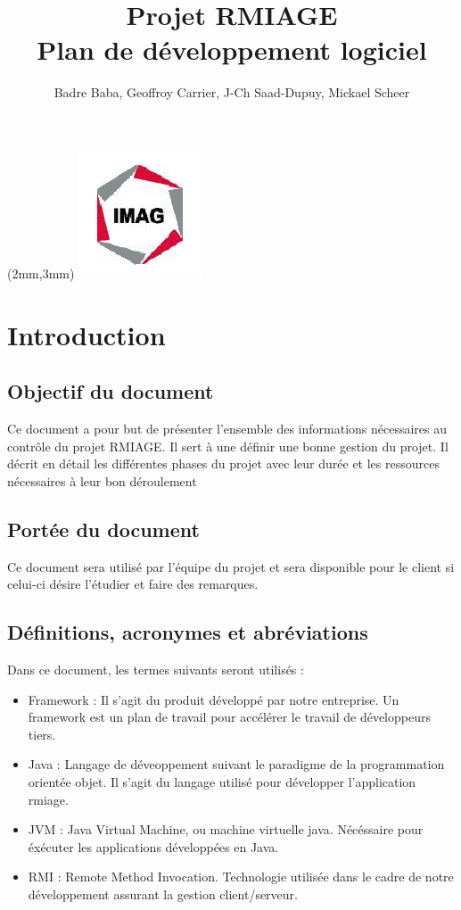 \documentclass[a4paper,10pt,twoside]{article}
\begin{document}
\title{Projet RMIAGE\\ \Huge{Plan de développement logiciel} }
\author{
	Badre Baba, Geoffroy Carrier, J-Ch Saad-Dupuy, Mickael Scheer
}

\begin{center}
\begin{textblock*}{35cm}(2mm,3mm)
\includegraphics[scale=0.8]{../cc/imag_logo.png}
\end{textblock*}
\end{center}
 
\maketitle


\section{Introduction}
\subsection{Objectif du document}
Ce document a pour but de présenter l'ensemble des informations nécessaires au
contrôle du projet RMIAGE. Il sert à une définir une bonne gestion du projet.
Il décrit en détail les différentes phases du projet avec leur durée et les ressources nécessaires à leur bon 	déroulement

\subsection{Portée du document}
Ce document sera utilisé par l’équipe du projet et sera disponible pour le client si celui-ci désire l’étudier et faire des remarques. 

\subsection{Définitions, acronymes et abréviations}
Dans ce document, les termes suivants seront utilisés :
\begin{itemize}
	\item Framework :
Il s'agit du produit développé par notre entreprise. Un framework est un plan de travail pour accélérer le travail de développeurs tiers.
	\item Java :
Langage de déveoppement suivant le paradigme de la programmation orientée objet. Il s'agit du langage utilisé pour développer l'application rmiage.
	\item JVM :
Java Virtual Machine, ou machine virtuelle java. Nécéssaire pour éxécuter les applications développées en Java.
	\item RMI :
Remote Method Invocation. Technologie utilisée dans le cadre de notre développement assurant
la gestion client/serveur.
\end{itemize}
\end{document}
